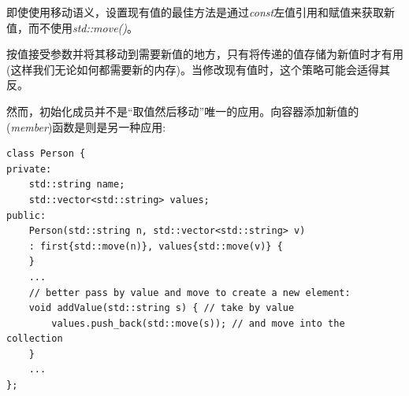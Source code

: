 即使使用移动语义，设置现有值的最佳方法是通过\textit{const}左值引用和赋值来获取新值，而不使用\textit{std::move()}。\par

按值接受参数并将其移动到需要新值的地方，只有将传递的值存储为新值时才有用(这样我们无论如何都需要新的内存)。当修改现有值时，这个策略可能会适得其反。\par

然而，初始化成员并不是“取值然后移动”唯一的应用。向容器添加新值的(\textit{member})函数是则是另一种应用:\par

\begin{lstlisting}[caption={}]
class Person {
private:
	std::string name;
	std::vector<std::string> values;
public:
	Person(std::string n, std::vector<std::string> v)
	: first{std::move(n)}, values{std::move(v)} {
	}
	...
	// better pass by value and move to create a new element:
	void addValue(std::string s) { // take by value
		values.push_back(std::move(s)); // and move into the collection
	}
	...
};
\end{lstlisting}
























